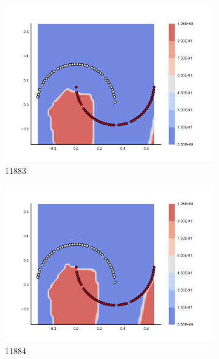 \begin{figure}[h]
\begin{subfigure}[b]{0.09\textwidth}
    \includegraphics[clip, trim=2.35cm 1.75cm 4.5cm 0cm,width=\textwidth]{img/convergence/11883.pdf}
    \caption{11883}
    \label{fig:convergence_11883}
\end{subfigure}
%
\begin{subfigure}[b]{0.09\textwidth}
    \includegraphics[clip, trim=2.35cm 1.75cm 4.5cm 0cm,width=\textwidth]{img/convergence/11884.pdf}
    \caption{11884}
    \label{fig:convergence_11884}
\end{subfigure}
%
\begin{subfigure}[b]{0.09\textwidth}

\end{subfigure}
\end{figure}
